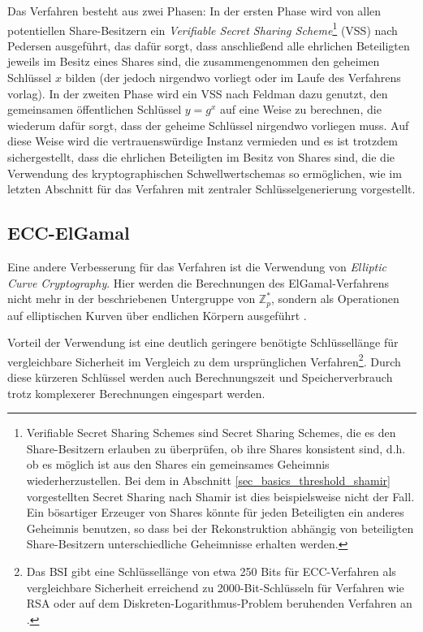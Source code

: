 Das Verfahren besteht aus zwei Phasen: In der ersten Phase wird von allen potentiellen Share-Besitzern ein \textit{Verifiable Secret Sharing Scheme}\footnote{
  Verifiable Secret Sharing Schemes sind Secret Sharing Schemes, die es den Share-Besitzern erlauben zu überprüfen, ob ihre Shares konsistent sind, d.h. ob es möglich ist aus den Shares ein gemeinsames Geheimnis wiederherzustellen. Bei dem in Abschnitt \ref{sec_basics_threshold_shamir} vorgestellten Secret Sharing nach Shamir ist dies beispielsweise nicht der Fall. Ein bösartiger Erzeuger von Shares könnte für jeden Beteiligten ein anderes Geheimnis benutzen, so dass bei der Rekonstruktion abhängig von beteiligten Share-Besitzern unterschiedliche Geheimnisse erhalten werden.
} (VSS) nach Pedersen ausgeführt, das dafür sorgt, dass anschließend alle ehrlichen Beteiligten jeweils im Besitz eines Shares sind, die zusammengenommen den geheimen Schlüssel \(x\) bilden (der jedoch nirgendwo vorliegt oder im Laufe des Verfahrens vorlag). In der zweiten Phase wird ein VSS nach Feldman dazu genutzt, den gemeinsamen öffentlichen Schlüssel \(y = g^x\) auf eine Weise zu berechnen, die wiederum dafür sorgt, dass der geheime Schlüssel nirgendwo vorliegen muss. Auf diese Weise wird die vertrauenswürdige Instanz vermieden und es ist trotzdem sichergestellt, dass die ehrlichen Beteiligten im Besitz von Shares sind, die die Verwendung des kryptographischen Schwellwertschemas so ermöglichen, wie im letzten Abschnitt für das Verfahren mit zentraler Schlüsselgenerierung vorgestellt.

\subsection{ECC-ElGamal}

\label{sec_state_threshold_ecc}

Eine andere Verbesserung für das Verfahren ist die Verwendung von \textit{Elliptic Curve Cryptography}. Hier werden die Berechnungen des ElGamal-Verfahrens nicht mehr in der beschriebenen Untergruppe von \(\mathbb{Z}_p^*\), sondern als Operationen auf elliptischen Kurven über endlichen Körpern ausgeführt \cite{koblitz1987elliptic}.

Vorteil der Verwendung ist eine deutlich geringere benötigte Schlüssellänge für vergleichbare Sicherheit im Vergleich zu dem ursprünglichen Verfahren\footnote{
  Das BSI gibt eine Schlüssellänge von etwa 250 Bits für ECC-Verfahren als vergleichbare Sicherheit erreichend zu 2000-Bit-Schlüsseln für Verfahren wie RSA oder auf dem Diskreten-Logarithmus-Problem beruhenden Verfahren an \cite{bsi2018}.
}. Durch diese kürzeren Schlüssel werden auch Berechnungszeit und Speicherverbrauch trotz komplexerer Berechnungen eingespart werden.

